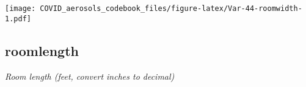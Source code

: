 \documentclass[]{article}
\begin{document}
\begin{minipage}{0.25 \textwidth}

\texttt{[image: COVID\_aerosols\_codebook\_files/figure-latex/Var-44-roomwidth-1.pdf]}

\end{minipage}

\noindent\makebox[\linewidth]{\rule{\textwidth}{0.4pt}}

\hypertarget{roomlength}{%
\subsection{roomlength}\label{roomlength}}

\emph{Room length (feet, convert inches to decimal)}

\begin{minipage}{0.75 \textwidth}


\end{minipage}
\end{document}
